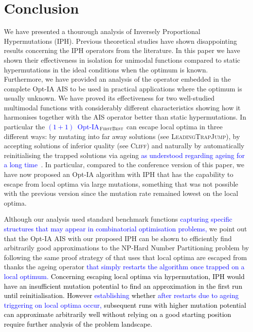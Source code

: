\documentclass[lettersize,journal]{IEEEtran}
\newcommand{\rev}[1]{\textcolor{blue}{#1}}
\begin{document}
\section{Conclusion}
We have presented a thourough analysis of Inversely Proportional Hypermutations (IPH).
Previous theoretical studies have shown disappointing results concerning the IPH operators from the literature.
In this paper we have 
shown their effectiveness in isolation for unimodal functions compared to static hypermutations in the ideal conditions when the optimum is known.
Furthermore, we have provided an analysis of the operator embedded in the complete Opt-IA AIS to be used in practical applications where the optimum is usually unknown.
We have proved its effectiveness for two well-studied multimodal functions with considerably different characteristics showing how it harmonises together with the AIS operator better than static hypermutations.
In particular the \rev{$(1+1)$~Opt-IA$_{\textsc{FirstBest}}$} can escape local optima in three different ways: by mutating into far away solutions (see \textsc{LeadingTrapJump}), by accepting solutions of inferior quality (see \textsc{Cliff}) and naturally by automatically reinitialising the trapped solutions via ageing \rev{as understood regarding ageing for a long time~\cite{HorobaJansenZarges09,JansenZarges2011differentageing,JansenZarges2010restart,OlivetoSudholt2014ageing}}.
In particular, compared to the conference version of this paper, we have now proposed an Opt-IA algorithm with IPH that has the capability to escape from local optima via large mutations, something that was not possible with the previous version since the mutation rate remained lowest on the local optima.


Although our analysis used standard benchmark functions \rev{capturing specific structures that may appear in combinatorial optimisation problems,}
 we point out that the Opt-IA AIS with our proposed IPH can be shown to efficiently find arbitrarily good approximations to the NP-Hard Number Partitioning problem by following the same proof strategy of \cite{CorusOlivetoYazdaniAIJ2019} that uses that local optima are escaped from thanks the ageing operator \rev{that simply restarts the algorithm once trapped on a local optimum.}  \textcolor{black}{Concerning escaping local optima via hypermutation, IPH would have an insufficient mutation potential to find an approximation in the first run until reinitialisation. However \rev{establishing} whether \rev{after restarts due to ageing triggering on local optima occur,} subsequent runs  with higher mutation potential can approximate arbitrarily well without relying on a good starting position require further analysis of the problem landscape.} 
\end{document}
